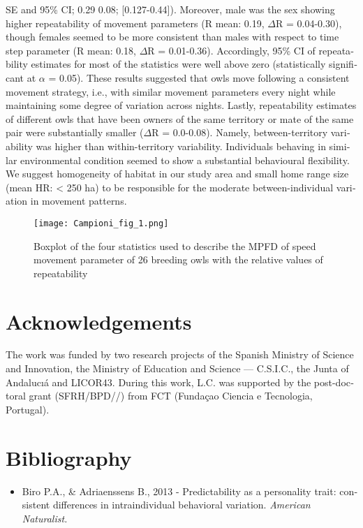 \begin{otherlanguage}{english}
{\textpm} SE and 95\% CI; 0.29 {\textpm} 0.08; [0.127-0.44]). Moreover,
male was the sex showing higher repeatability of movement parameters (R
mean: 0.19, $\Delta $R = 0.04-0.30), though females seemed to be more
consistent than males with respect to time step parameter (R mean:
0.18, $\Delta $R = 0.01-0.36). Accordingly, 95\% CI of repeatability
estimates for most of the statistics were well above zero
(statistically significant at $\alpha $ = 0.05). These results
suggested that owls move following a consistent movement strategy,
i.e., with similar movement parameters every night while maintaining
some degree of variation across nights. Lastly, repeatability estimates
of different owls that have been owners of the same territory or mate
of the same pair were substantially smaller ($\Delta $R = 0.0-0.08).
Namely, between-territory variability was higher than within-territory
variability. Individuals behaving in similar environmental condition
seemed to show a substantial behavioural flexibility. We suggest
homogeneity of habitat in our study area and small home range size
(mean HR: {\textless} 250 ha) to be responsible for the moderate
between-individual variation in movement patterns. 

\begin{figure}[!h]
\centering
\texttt{[image: Campioni\_fig\_1.png]}
\caption{Boxplot of the four statistics used to describe the MPFD of speed movement parameter of 26 breeding owls with the relative values of repeatability}
\label{Campioni_fig_1}
\end{figure}

\section*{Acknowledgements}

The work was funded by two research projects of the Spanish Ministry of
Science and Innovation, the Ministry of Education and Science ---
C.S.I.C., the Junta of Andaluc{\i}\'a and LICOR43. During this work,
L.C. was supported by the post-doctoral grant (SFRH/\allowbreak BPD//)
from FCT (Funda\c{c}ao Ciencia e Tecnologia, Portugal).

\section*{Bibliography}
\begin{itemize}\itemsep0pt
	\item Biro P.A., \& Adriaenssens B., 2013 - Predictability as a personality
trait: consistent differences in intraindividual behavioral variation.
\textit{American Naturalist.}


\end{itemize}
\end{otherlanguage}
